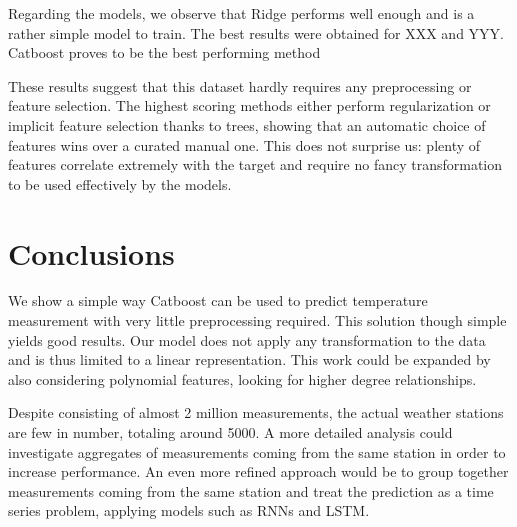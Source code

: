 \documentclass{article}
\begin{document}
Regarding the models, we observe that Ridge performs well enough and is a rather simple model to train. The best results were obtained for XXX and YYY.
Catboost proves to be the best performing method

These results suggest that this dataset hardly requires any preprocessing or feature selection. The highest scoring methods either perform regularization or implicit feature selection thanks to trees, showing that an automatic choice of features wins over a curated manual one. This does not surprise us: plenty of features correlate extremely with the target and require no fancy transformation to be used effectively by the models.

\section{Conclusions}
We show a simple way Catboost can be used to predict temperature measurement with very little preprocessing required. This solution though simple yields good results.
Our model does not apply any transformation to the data and is thus limited to a linear representation. This work could be expanded by also considering polynomial features, looking for higher degree relationships.

Despite consisting of almost 2 million measurements, the actual weather stations are few in number, totaling around 5000. A more detailed analysis could investigate aggregates of measurements coming from the same station in order to increase performance. An even more refined approach would be to group together measurements coming from the same station and treat the prediction as a time series problem, applying models such as RNNs and LSTM.
\end{document}
